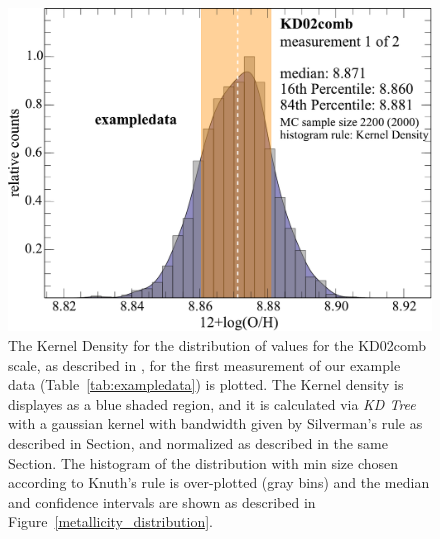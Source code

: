 \documentclass{emulateapj}
\begin{document}
\begin{figure}[ht!]
  \includegraphics[width=1.0\columnwidth]{exampledata_n2000_KD02comb_1KDE.pdf}
   \caption{The Kernel Density for the distribution of values for the KD02comb scale, as described in \citet{kewley08}, for the first measurement of our example data (Table~\ref{tab:exampledata}) is plotted. The Kernel density is displayes as a blue shaded region, and it is calculated via \emph{KD Tree} with a gaussian kernel with bandwidth given by Silverman's rule as described in Section\label{vizs}, and normalized as described in the same Section. The histogram of the distribution with min size chosen according to Knuth's rule is over-plotted (gray bins) and the median and confidence intervals are shown as described in Figure~\ref{metallicity_distribution}.}\label{fig:KDE}

\end{figure}
\end{document}

